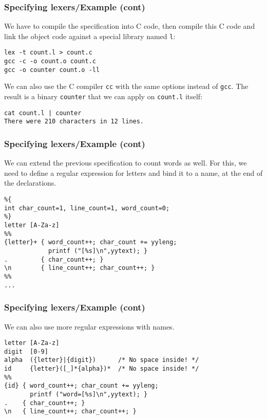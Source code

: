 % 
\begin{frame}[containsverbatim]
\frametitle{Specifying lexers/Example (cont)}
 
We have to compile the \Lex specification into C code, then compile
this C code and link the object code against a special library named
\verb+l+:
{\small
\begin{verbatim}
lex -t count.l > count.c
gcc -c -o count.o count.c
gcc -o counter count.o -ll
\end{verbatim}
}
We can also use the C compiler \texttt{cc} with the same options
instead of \texttt{gcc}. The result is a binary \texttt{counter} that
we can apply on \texttt{count.l} itself:
{\small
\begin{verbatim}
cat count.l | counter
There were 210 characters in 12 lines.
\end{verbatim}
}

\end{frame}

% 
\begin{frame}[containsverbatim]
\frametitle{Specifying lexers/Example (cont)}
 
We can extend the previous specification to count words as well. For
this, we need to define a regular expression for letters and bind it
to a name, at the end of the declarations.
{\small
\begin{verbatim}
%{
int char_count=1, line_count=1, word_count=0;
%}
letter [A-Za-z]
%%
{letter}+ { word_count++; char_count += yyleng;
            printf ("[%s]\n",yytext); }
.         { char_count++; }
\n        { line_count++; char_count++; }
%%
...
\end{verbatim}
}

\end{frame}

% 
\begin{frame}[containsverbatim]
\frametitle{Specifying lexers/Example (cont)}
 
We can also use more regular expressions with names.
{\small
\begin{verbatim}
letter [A-Za-z]
digit  [0-9]
alpha  ({letter}|{digit})      /* No space inside! */
id     {letter}([_]*{alpha})*  /* No space inside! */
%%
{id} { word_count++; char_count += yyleng;
       printf ("word=[%s]\n",yytext); }
.    { char_count++; }
\n   { line_count++; char_count++; }
\end{verbatim}
}
\end{frame}

